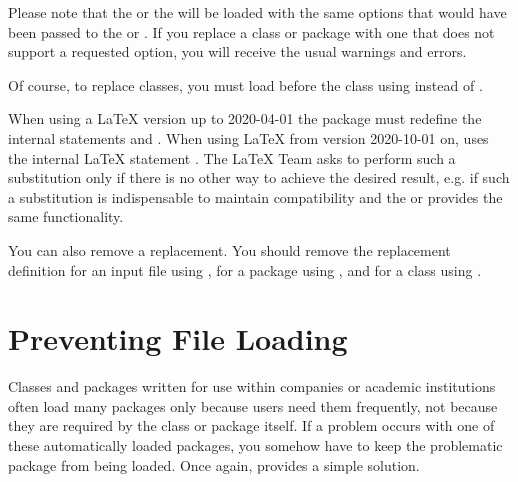 Please note that the  or the
 will be loaded with the same options that would
have been passed to the  or . If
you replace a class or package with one that does not support a requested
option, you will receive the usual warnings and errors.

Of course, to replace classes, you must load  before the
class using  instead of .

When using a \LaTeX{} version up to
2020-04-01 the package  must redefine the
internal statements  and
. When using \LaTeX{} from version 2020-10-01 on,
 uses the internal \LaTeX{} statement
. The \LaTeX{} Team asks to perform such a
substitution only if there is no other way to achieve the desired result,
e.g. if such a substitution is indispensable to maintain compatibility and the
 or  provides the same
functionality.%
\EndIndexGroup


\begin{Declaration}
\end{Declaration}
You can also remove a replacement. You
should remove the replacement definition for an input file using
, for a package using , and for
a class using .%
\EndIndexGroup


\section{Preventing File Loading}

Classes and packages written for use
within companies or academic institutions often load many packages only
because users need them frequently, not because they are required by the class
or package itself. If a problem occurs with one of these automatically loaded
packages, you somehow have to keep the problematic package from being loaded.
Once again,  provides a simple solution.

